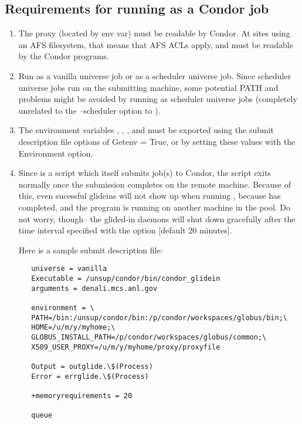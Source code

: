 \subsection{Requirements for running  as a Condor job}
\begin{enumerate}
\item The proxy (located by  env var) must be readable by
Condor. At sites using an AFS filesystem, that means that AFS ACLs apply, and must be readable by the Condor programs.

\item Run  as a vanilla universe job or as a scheduler universe 
job. Since scheduler universe jobs run on the submitting machine, some potential
PATH and  problems might be avoided by running as scheduler universe jobs (completely unrelated to the --scheduler option to ).

\item The environment variables   , , , and  must be exported using the submit description file options of Getenv = True, or by setting these values with the Environment option.

\item Since  is a script which itself submits job(s) to Condor, 
the  script exits normally once the submission completes on
the remote machine. Because of this, even sucessful glideins will not show up
when running , because  has completed, and the
 program is running on another machine in the pool. Do not
worry, though-- the glided-in daemons will shut down gracefully after the
time interval specified with the  option [default 20 minutes].

Here is a sample submit description file:

\begin{verbatim}
   universe = vanilla
   Executable = /unsup/condor/bin/condor_glidein
   arguments = denali.mcs.anl.gov

   environment = \
   PATH=/bin:/unsup/condor/bin:/p/condor/workspaces/globus/bin;\
   HOME=/u/m/y/myhome;\
   GLOBUS_INSTALL_PATH=/p/condor/workspaces/globus/common;\
   X509_USER_PROXY=/u/m/y/myhome/proxy/proxyfile

   Output = outglide.\$(Process)
   Error = errglide.\$(Process)

   +memoryrequirements = 20

   queue
\end{verbatim}
\end{enumerate}

